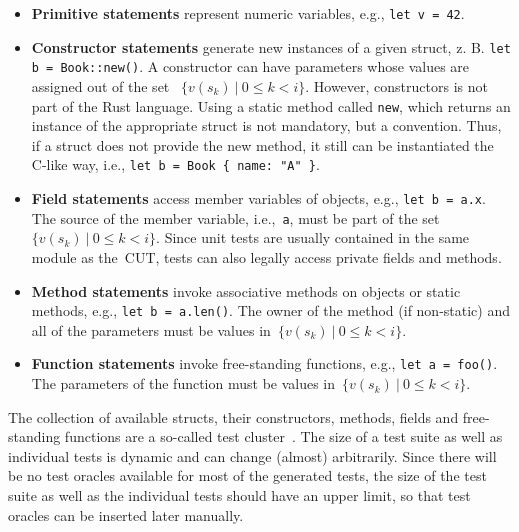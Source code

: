 \documentclass{article}
\begin{document}
\begin{itemize} 
    \item \textbf{Primitive statements} represent numeric variables, e.g., \lstinline{let v = 42}.
    \item \textbf{Constructor statements} generate new instances of a given struct, z. B. \lstinline{let b = Book::new()}. A constructor can have parameters whose values are assigned out of the set ~$\{v(s_k)~|~0 \leq k < i\}$. However, constructors is not part of the Rust language. Using a static method called \lstinline{new}, which returns an instance of the appropriate struct is not mandatory, but a convention. Thus, if a struct does not provide the new method, it still can be instantiated the C-like way, i.e., \lstinline|let b = Book { name: "A" }|. 
    \item \textbf{Field statements} access member variables of objects, e.g., \lstinline{let b = a.x}. The source of the member variable, i.e.,~\lstinline{a}, must be part of the set~$\{v(s_k)~|~0 \leq k < i\}$. Since unit tests are usually contained in the same module as the~\ac{CUT}, tests can also legally access private fields and methods. 
    \item \textbf{Method statements} invoke associative methods on objects or static methods, e.g., \lstinline{let b = a.len()}. The owner of the method (if non-static) and all of the parameters must be values in~${\{v(s_k)~|~0 \leq k < i\}}$.
    \item \textbf{Function statements} invoke free-standing functions, e.g., \lstinline{let a = foo()}. The parameters of the function must be values in~$\{v(s_k)~|~0 \leq k < i\}$. 
\end{itemize}


The collection of available structs, their constructors, methods, fields and free-standing functions are a so-called test cluster~\cite{Fraser_2011}. The size of a test suite as well as individual tests is dynamic and can change (almost) arbitrarily. Since there will be no test oracles available for most of the generated tests, the size of the test suite as well as the individual tests should have an upper limit, so that test oracles can be inserted later manually. 
\end{document}
